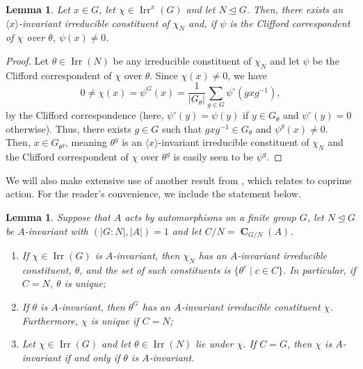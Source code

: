 \documentclass[12pt]{amsart}
\DeclareMathOperator{\CB}{\mathbf{C}}
\DeclareMathOperator{\Irr}{Irr}
\theoremstyle{remark}
\theoremstyle{definition}
\theoremstyle{plain}
\newtheorem{lem}[thm]{Lemma}
\theoremstyle{definition}
\numberwithin{equation}{section}
\begin{document}
\begin{lem}
	\label{nonVanishingInvarConst}
	Let $x \in G$, let $\chi \in \Irr^x(G)$ and let $N \unlhd G$. Then, there exists an $\langle x \rangle$-invariant irreducible constituent of $\chi_N$ and, if $\psi$ is the Clifford correspondent of $\chi$ over $\theta$, $\psi(x) \neq 0$.
\end{lem}

\begin{proof}
	Let $\theta \in \Irr(N)$ be any irreducible constituent of $\chi_N$ and let $\psi$ be the Clifford correspondent of $\chi$ over $\theta$. Since $\chi(x) \neq 0$, we have
	\begin{equation*}
		0 \neq \chi(x) = \psi^G(x) = \frac{1}{|G_\theta|} \sum_{g \in G} \psi^\circ (gxg^{-1}),
	\end{equation*}
	by the Clifford correspondence (here, $\psi^\circ(y) = \psi(y)$ if $y \in G_\theta$ and $\psi^\circ(y) = 0$ otherwise). Thus, there exists $g \in G$ such that $gxg^{-1} \in G_\theta$ and $\psi^g(x) \neq 0$. Then, $x \in G_{\theta^g}$, meaning $\theta^g$ is an $\langle x \rangle$-invariant irreducible constituent of $\chi_N$ and the Clifford correspondent of $\chi$ over $\theta^g$ is easily seen to be $\psi^g$.
\end{proof}

We will also make extensive use of another result from \cite{PickyPSolvable}, which relates to coprime action. For the reader's convenience, we include the statement below.

\begin{lem}
	\label{ElementaryCoprimeActionLemma}
	Suppose that $A$ acts by automorphisms on a finite group $G$, let $N \unlhd G$ be $A$-invariant with $(|G:N|, |A|) = 1$ and let $C/N = \CB_{G/N}(A)$.
	\begin{enumerate}
		\item If $\chi \in \Irr(G)$ is $A$-invariant, then $\chi_N$ has an $A$-invariant irreducible constituent, $\theta$, and the set of such constituents is $\{\theta^c \mid c \in C\}$. In particular, if $C = N$, $\theta$ is unique;
		\item If $\theta$ is $A$-invariant, then $\theta^G$ has an $A$-invariant irreducible constituent $\chi$. Furthermore, $\chi$ is unique if $C = N$;
		\item Let $\chi \in \Irr(G)$ and let $\theta \in \Irr(N)$ lie under $\chi$. If $C = G$, then $\chi$ is $A$-invariant if and only if $\theta$ is $A$-invariant.
	\end{enumerate}
\end{lem}
\end{document}
